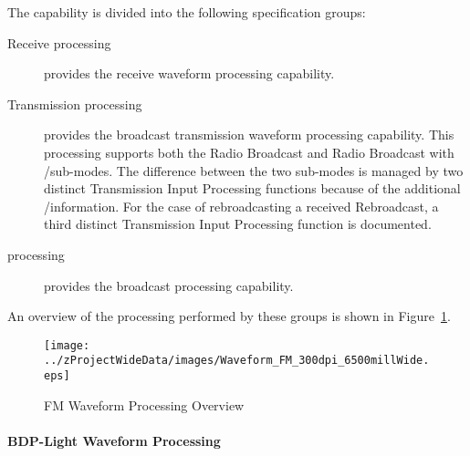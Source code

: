 The \ThisSys \ThisSegment \FM capability is divided into the following specification groups:
\begin{description}
	\item[Receive processing] provides the \FM receive waveform processing capability.
	\item[Transmission processing] provides the \FM broadcast transmission waveform processing capability. This processing supports both the \FM Radio Broadcast and \FM Radio Broadcast with \RDS/\RBDS sub-modes. The difference between the two sub-modes is managed by two distinct Transmission Input Processing functions because of the additional \RDS/\RBDS information. For the case of rebroadcasting a received \FM Rebroadcast, a third distinct Transmission Input Processing function is documented.
	\item[\VSWR processing] provides the \FM broadcast \VSWR processing capability.
\end{description}
An overview of the processing performed by these groups is shown in Figure~\ref{fig:FM_Waveform_Processing}.
\begin{figure}[htbp]
	\centering
		\texttt{[image: ../zProjectWideData/images/Waveform\_FM\_300dpi\_6500millWide.eps]}
	\caption[FM Waveform Processing Overview]{FM Waveform Processing Overview}
	\label{fig:FM_Waveform_Processing}
\end{figure}


\KNEADPARAGRAPHNEWPAGE
\paragraph{BDP-Light \FM Waveform Processing}
\label{loc:Waveform_FM_Light}
\renewcommand{\ThisSubSegment}{BDP-Light \FM Waveform Processing\xspace}%


